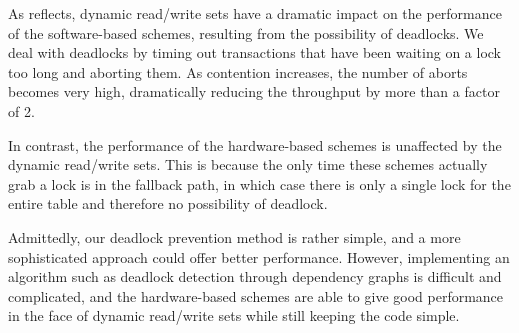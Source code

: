 As  reflects, dynamic read/write sets have a dramatic impact
on the performance of the software-based schemes, resulting from the possibility
of deadlocks. We deal with deadlocks by timing out transactions that have been
waiting on a lock too long and aborting them. As contention increases, the
number of aborts becomes very high, dramatically reducing the throughput by more
than a factor of 2.

In contrast, the performance of the hardware-based schemes is unaffected by 
the dynamic read/write sets. This is because the only time these schemes 
actually grab a lock is in the fallback path, in which case there is only a 
single lock for the entire table and therefore no possibility of deadlock.

Admittedly, our deadlock prevention method is rather simple, and a more
sophisticated approach could offer better performance. However, implementing an
algorithm such as deadlock detection through dependency graphs is difficult and
complicated, and the hardware-based schemes are able to give good performance in
the face of dynamic read/write sets while still keeping the code simple.


